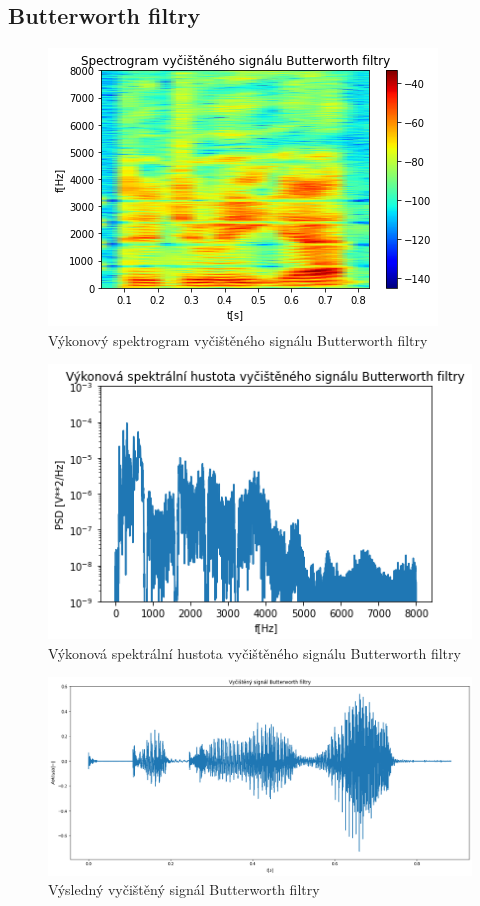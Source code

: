 \documentclass{article}
\begin{document}
\subsection{Butterworth filtry}
\begin{figure}[H] 
	\centering
	\includegraphics[scale=0.65,keepaspectratio]{Figure_27}
	\caption{Výkonový spektrogram vyčištěného signálu Butterworth filtry}
\end{figure}

\begin{figure}[H] 
	\centering
	\includegraphics[scale=0.65,keepaspectratio]{Figure_28}
	\caption{Výkonová spektrální hustota vyčištěného signálu Butterworth filtry}
\end{figure}

\begin{landscape}
\begin{figure}[H] 
	\centering
	\includegraphics[scale=0.55,keepaspectratio]{Figure_29}
	\caption{Výsledný vyčištěný signál Butterworth filtry}
\end{figure}
\end{landscape}
\end{document}
